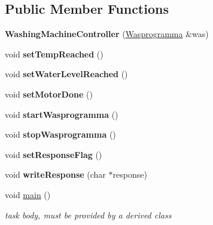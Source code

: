 \subsection*{Public Member Functions}
\begin{DoxyCompactItemize}
\item 
{\bfseries Washing\+Machine\+Controller} (\hyperlink{class_wasprogramma}{Wasprogramma} \&was)\hypertarget{class_washing_machine_controller_a15af43256fbdee552355756c08476af7}{}\label{class_washing_machine_controller_a15af43256fbdee552355756c08476af7}

\item 
void {\bfseries set\+Temp\+Reached} ()\hypertarget{class_washing_machine_controller_a6e3505a7980edb64da5052ef47b27f7e}{}\label{class_washing_machine_controller_a6e3505a7980edb64da5052ef47b27f7e}

\item 
void {\bfseries set\+Water\+Level\+Reached} ()\hypertarget{class_washing_machine_controller_abaf045765c931925adbfd73a7138953b}{}\label{class_washing_machine_controller_abaf045765c931925adbfd73a7138953b}

\item 
void {\bfseries set\+Motor\+Done} ()\hypertarget{class_washing_machine_controller_a0745a4b64d14100b43cab978dc2a9a2d}{}\label{class_washing_machine_controller_a0745a4b64d14100b43cab978dc2a9a2d}

\item 
void {\bfseries start\+Wasprogramma} ()\hypertarget{class_washing_machine_controller_ae231a4bfe9803d1cf5819c08856da56b}{}\label{class_washing_machine_controller_ae231a4bfe9803d1cf5819c08856da56b}

\item 
void {\bfseries stop\+Wasprogramma} ()\hypertarget{class_washing_machine_controller_a7ec5a9a888007149d8c586258c1237d7}{}\label{class_washing_machine_controller_a7ec5a9a888007149d8c586258c1237d7}

\item 
void {\bfseries set\+Response\+Flag} ()\hypertarget{class_washing_machine_controller_a739f319ae0206c266cd5a179f5f7c533}{}\label{class_washing_machine_controller_a739f319ae0206c266cd5a179f5f7c533}

\item 
void {\bfseries write\+Response} (char $\ast$response)\hypertarget{class_washing_machine_controller_a73ad609fd09ede6f2b6a153006104191}{}\label{class_washing_machine_controller_a73ad609fd09ede6f2b6a153006104191}

\item 
void \hyperlink{class_washing_machine_controller_a0d955e011f1f59e902fb62e4d03fc883}{main} ()
\begin{DoxyCompactList}\small\item\em task body, must be provided by a derived class \end{DoxyCompactList}\end{DoxyCompactItemize}
